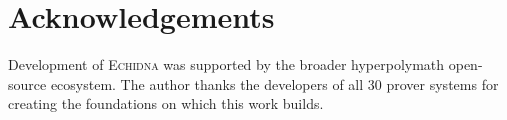 \documentclass[11pt,a4paper]{article}
\newcommand{\echidna}{\textsc{Echidna}}
\begin{document}

\section*{Acknowledgements}

Development of \echidna{} was supported by the broader hyperpolymath open-source
ecosystem. The author thanks the developers of all 30 prover systems for
creating the foundations on which this work builds.

\end{document}
